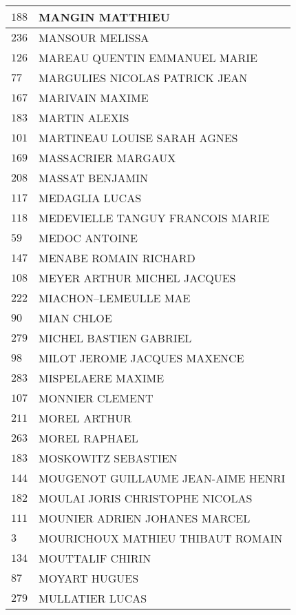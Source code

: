 \begin{xltabular}{\linewidth}{|l|X|}
    $188$ & MANGIN MATTHIEU \\
    \hline
    $236$ & MANSOUR MELISSA \\
    \hline
    $126$ & MAREAU QUENTIN EMMANUEL MARIE \\
    \hline
    $77$ & MARGULIES NICOLAS PATRICK JEAN \\
    \hline
    $167$ & MARIVAIN MAXIME \\
    \hline
    $183$ & MARTIN ALEXIS \\
    \hline
    $101$ & MARTINEAU LOUISE SARAH AGNES \\
    \hline
    $169$ & MASSACRIER MARGAUX \\
    \hline
    $208$ & MASSAT BENJAMIN \\
    \hline
    $117$ & MEDAGLIA LUCAS \\
    \hline
    $118$ & MEDEVIELLE TANGUY FRANCOIS MARIE \\
    \hline
    $59$ & MEDOC ANTOINE \\
    \hline
    $147$ & MENABE ROMAIN RICHARD \\
    \hline
    $108$ & MEYER ARTHUR MICHEL JACQUES \\
    \hline
    $222$ & MIACHON--LEMEULLE MAE \\
    \hline
    $90$ & MIAN CHLOE \\
    \hline
    $279$ & MICHEL BASTIEN GABRIEL \\
    \hline
    $98$ & MILOT JEROME JACQUES MAXENCE \\
    \hline
    $283$ & MISPELAERE MAXIME \\
    \hline
    $107$ & MONNIER CLEMENT \\
    \hline
    $211$ & MOREL ARTHUR \\
    \hline
    $263$ & MOREL RAPHAEL \\
    \hline
    $183$ & MOSKOWITZ SEBASTIEN \\
    \hline
    $144$ & MOUGENOT GUILLAUME JEAN-AIME HENRI \\
    \hline
    $182$ & MOULAI JORIS CHRISTOPHE NICOLAS \\
    \hline
    $111$ & MOUNIER ADRIEN JOHANES MARCEL \\
    \hline
    $3$ & MOURICHOUX MATHIEU THIBAUT ROMAIN \\
    \hline
    $134$ & MOUTTALIF CHIRIN \\
    \hline
    $87$ & MOYART HUGUES \\
    \hline
    $279$ & MULLATIER LUCAS \\

\end{xltabular}

